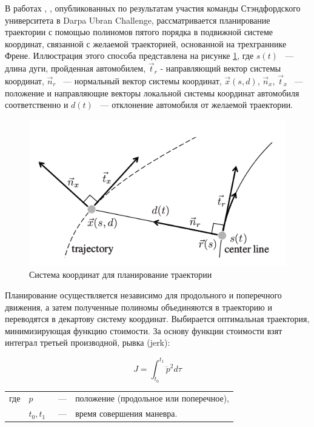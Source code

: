 В работах \cite{darpa_junior_path_planning_1}, \cite{darpa_junior_frenet},
опубликованных по результатам участия команды Стэндфордского университета в Darpa Ubran Challenge,
рассматривается планирование траектории с помощью полиномов пятого порядка в подвижной системе координат,
связанной с желаемой траекторией, основанной на трехграннике Френе. Иллюстрация этого способа представлена на
рисунке \ref{img:junior_frenet_frame}, где
$s(t)$  ~--- длина дуги, пройденная автомобилем, $\vec{t}_r$ - направляющий вектор системы координат,
$\vec{n}_r$  ~--- нормальный вектор системы координат, $\vec{x}(s,d)$, $\vec{n}_x$,
$\vec{t}_x$ ~--- положение и направляющие векторы локальной системы координат автомобиля соответственно и
$d(t)$ ~--- отклонение автомобиля от желаемой траектории.

\begin{figure}[h]
    \centering
    \includegraphics[]{images/junior_frenet_frame}
    \caption{Система координат для планирование траектории}
    \label{img:junior_frenet_frame}
\end{figure}


Планирование осуществляется независимо для продольного и поперечного движения,
а затем полученные полиномы объединяются в траекторию и переводятся в декартову систему координат.
Выбирается оптимальная траектория, минимизирующая функцию стоимости. За основу функции стоимости взят
интеграл третьей производной, рывка (jerk):

\begin{equation}
    J= \int_{t_0}^{t_1}{\dddot{p}^2 d\tau}
\end{equation}

\noindent\begin{tabularx}{\linewidth}{lllX}
    где & $p$         &~---& положение (продольное или поперечное), \\
        & $t_0, t_1$  &~---& время совершения маневра.
\end{tabularx}

